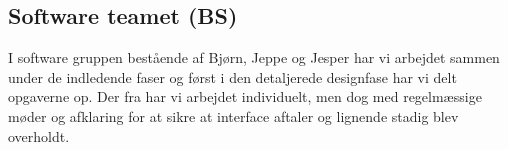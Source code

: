 \subsection{Software teamet (BS)}
I software gruppen bestående af Bjørn, Jeppe og Jesper har vi arbejdet sammen under de indledende faser og først i den detaljerede designfase har vi delt opgaverne op.
Der fra har vi arbejdet individuelt, men dog med regelmæssige møder og afklaring for at sikre at interface aftaler og lignende stadig blev overholdt.



 

